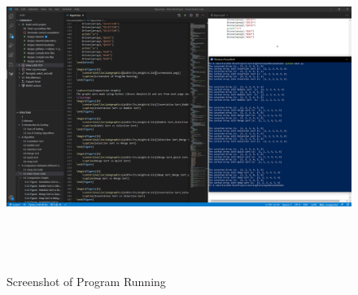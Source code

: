 \documentclass{article}
\begin{document}
\begin{figure}[h]
    \centerline{\includegraphics[width=7in,height=4.2in]{screenshot.png}}
    \caption{Screenshot of Program Running}
\end{figure}
\end{document}
